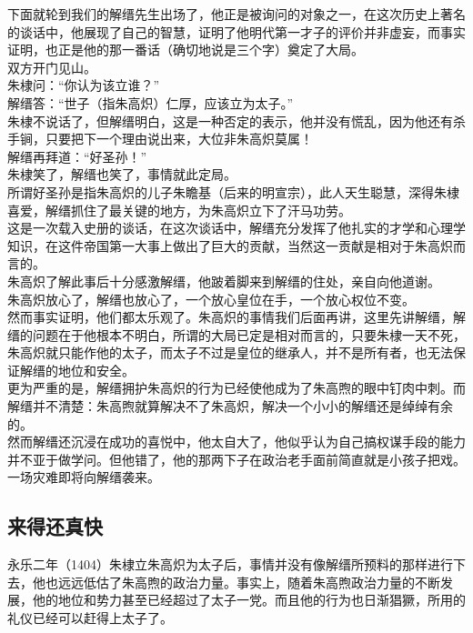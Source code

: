 \begin{multicols}{\theparacolNo}
下面就轮到我们的解缙先生出场了，他正是被询问的对象之一，在这次历史上著名的谈话中，他展现了自己的智慧，证明了他明代第一才子的评价并非虚妄，而事实证明，也正是他的那一番话（确切地说是三个字）奠定了大局。\\

双方开门见山。\\

朱棣问：“你认为该立谁？”\\

解缙答：“世子（指朱高炽）仁厚，应该立为太子。”\\

朱棣不说话了，但解缙明白，这是一种否定的表示，他并没有慌乱，因为他还有杀手锏，只要把下一个理由说出来，大位非朱高炽莫属！\\

解缙再拜道：“好圣孙！”\\

朱棣笑了，解缙也笑了，事情就此定局。\\

所谓好圣孙是指朱高炽的儿子朱瞻基（后来的明宣宗），此人天生聪慧，深得朱棣喜爱，解缙抓住了最关键的地方，为朱高炽立下了汗马功劳。\\

这是一次载入史册的谈话，在这次谈话中，解缙充分发挥了他扎实的才学和心理学知识，在这件帝国第一大事上做出了巨大的贡献，当然这一贡献是相对于朱高炽而言的。\\

朱高炽了解此事后十分感激解缙，他跛着脚来到解缙的住处，亲自向他道谢。\\

朱高炽放心了，解缙也放心了，一个放心皇位在手，一个放心权位不变。\\

然而事实证明，他们都太乐观了。朱高炽的事情我们后面再讲，这里先讲解缙，解缙的问题在于他根本不明白，所谓的大局已定是相对而言的，只要朱棣一天不死，朱高炽就只能作他的太子，而太子不过是皇位的继承人，并不是所有者，也无法保证解缙的地位和安全。\\

更为严重的是，解缙拥护朱高炽的行为已经使他成为了朱高煦的眼中钉肉中刺。而解缙并不清楚：朱高煦就算解决不了朱高炽，解决一个小小的解缙还是绰绰有余的。\\

然而解缙还沉浸在成功的喜悦中，他太自大了，他似乎认为自己搞权谋手段的能力并不亚于做学问。但他错了，他的那两下子在政治老手面前简直就是小孩子把戏。一场灾难即将向解缙袭来。\\

\subsection{来得还真快}
永乐二年（1404）朱棣立朱高炽为太子后，事情并没有像解缙所预料的那样进行下去，他也远远低估了朱高煦的政治力量。事实上，随着朱高煦政治力量的不断发展，他的地位和势力甚至已经超过了太子一党。而且他的行为也日渐猖獗，所用的礼仪已经可以赶得上太子了。\\


\end{multicols}
